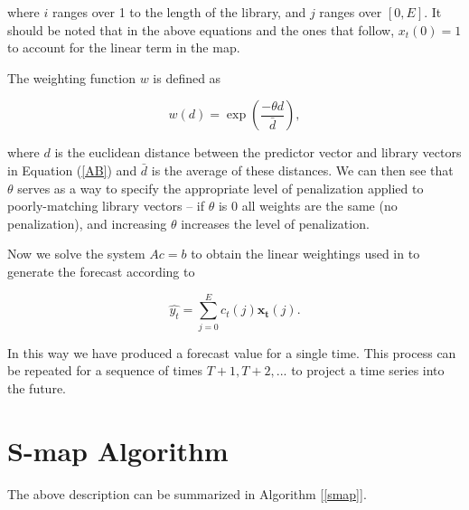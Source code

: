 \documentclass[12pt]{article}
\begin{document}
    where $i$ ranges over 1 to the length of the library, and $j$ ranges over $[0,E]$. It should be noted that in the above equations and the ones that follow, $x_t(0) = 1$ to account for the linear term in the map.

	The weighting function $w$ is defined as

	\begin{equation}
		w(d) = \exp \left( \frac{-\theta d}{\bar{d}} \right) ,
	\end{equation}

	where $d$ is the euclidean distance between the predictor vector and library vectors in Equation (\ref{AB}) and $\bar{d}$ is the average of these distances. We can then see that $\theta$ serves as a way to specify the appropriate level of penalization applied to poorly-matching library vectors -- if $\theta$ is 0 all weights are the same (no penalization), and increasing $\theta$ increases the level of penalization.

	Now we solve the system $Ac = b$ to obtain the linear weightings used in to generate the forecast according to

	\begin{equation}
		\hat{y_t} = \sum_{j = 0}^{E} c_t(j) \mathbf{x_t}(j) .
	\end{equation}

	In this way we have produced a forecast value for a single time. This process can be repeated for a sequence of times $T + 1, T + 2, ...$ to project a time series into the future.


\section{S-map Algorithm}

    The above description can be summarized in Algorithm [\ref{smap}].
\end{document}
